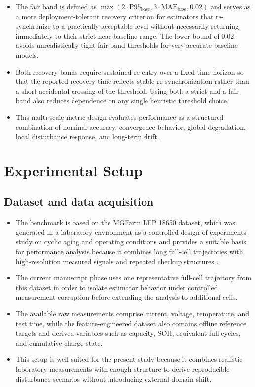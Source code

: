 \documentclass[review,nopreprintline]{elsarticle}
\begin{document}
\begin{itemize}[leftmargin=*]
    \item The fair band is defined as $\max(2 \cdot \mathrm{P95}_{\mathrm{base}},3 \cdot \mathrm{MAE}_{\mathrm{base}},0.02)$ and serves as a more deployment-tolerant recovery criterion for estimators that re-synchronize to a practically acceptable level without necessarily returning immediately to their strict near-baseline range. The lower bound of $0.02$ avoids unrealistically tight fair-band thresholds for very accurate baseline models.
    \item Both recovery bands require sustained re-entry over a fixed time horizon so that the reported recovery time reflects stable re-synchronization rather than a short accidental crossing of the threshold. Using both a strict and a fair band also reduces dependence on any single heuristic threshold choice.
    \item This multi-scale metric design evaluates performance as a structured combination of nominal accuracy, convergence behavior, global degradation, local disturbance response, and long-term drift.
\end{itemize}

\section{Experimental Setup}
\subsection{Dataset and data acquisition}
\begin{itemize}[leftmargin=*]
    \item The benchmark is based on the MGFarm LFP 18650 dataset, which was generated in a laboratory environment as a controlled design-of-experiments study on cyclic aging and operating conditions and provides a suitable basis for performance analysis because it combines long full-cell trajectories with high-resolution measured signals and repeated checkup structures \cite{aqachtoulMGFARMIoTEdgeDriven2026,LFP_DoE_Cycle_Aging_Dataset,siebertzStatistischeVersuchsplanung2017}.
    \item The current manuscript phase uses one representative full-cell trajectory from this dataset in order to isolate estimator behavior under controlled measurement corruption before extending the analysis to additional cells.
    \item The available raw measurements comprise current, voltage, temperature, and test time, while the feature-engineered dataset also contains offline reference targets and derived variables such as capacity, SOH, equivalent full cycles, and cumulative charge state.
    \item This setup is well suited for the present study because it combines realistic laboratory measurements with enough structure to derive reproducible disturbance scenarios without introducing external domain shift.
\end{itemize}
\end{document}
